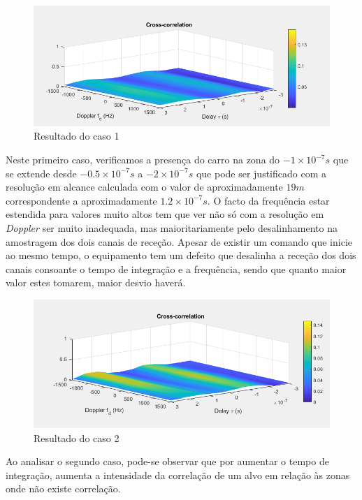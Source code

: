 \begin{figure}[h]
\centering
\includegraphics[scale=0.5]{chapters/ch5/assets/15me}
\caption[Caso 1]{Resultado do caso 1}
\label{fig:15me}
\end{figure}

Neste primeiro caso, verificamos a presença do carro na zona do $-1\times 10^{-7}s$ que se extende desde $-0.5\times 10^{-7}s$ a $-2\times 10^{-7}s$ que pode ser justificado com a resolução em alcance calculada com o valor de aproximadamente $19 m$ correspondente a aproximadamente $1.2\times 10^{-7} s$. O facto da frequência estar estendida para valores muito altos tem que ver não só com a resolução em \textit{Doppler} ser muito inadequada, mas maioritariamente pelo desalinhamento na amostragem dos dois canais de receção. Apesar de existir um comando que inicie ao mesmo tempo, o equipamento tem um defeito que desalinha a receção dos dois canais consoante o tempo de integração e a frequência, sendo que quanto maior valor estes tomarem, maior desvio haverá.

\begin{figure}[h]
\centering
\includegraphics[scale=0.5]{chapters/ch5/assets/15mm}
\caption[Caso 2]{Resultado do caso 2}
\label{fig:15mm}
\end{figure}

Ao analisar o segundo caso, pode-se observar que por aumentar o tempo de integração, aumenta a intensidade da correlação de um alvo em relação às zonas onde não existe correlação.


